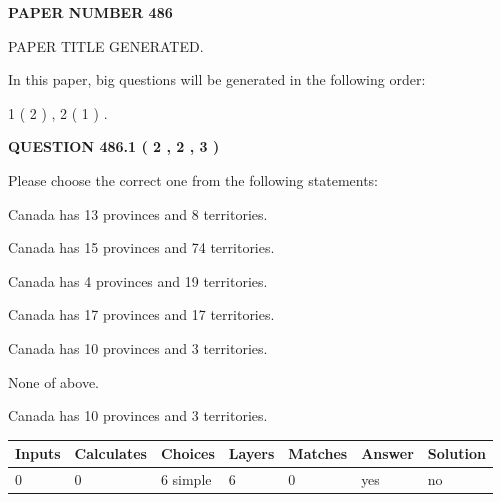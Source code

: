 \documentclass[12pt]{article}
\begin{document}
   
 {\textbf{ \Large{ PAPER NUMBER  486  }}}
   
   
\vspace{0.2in}
   
   
   
   
   
   
   
   
 \vspace{0.2in}
 
 
 
 
   
   
 PAPER TITLE GENERATED.
   
   
   
\vspace{0.2in}
   
In this paper, big questions will be generated in the following order: 
   
   
   1 ( 2 )
 ,
   2 ( 1 )
 .
  
\vspace{0.2in}
  
{\textbf{\Large{QUESTION
486.1 
 ( 2 , 2 , 3 )
}}}
  
  
Please choose the correct one from the following statements:
 
 
Canada has  13 provinces and  8 territories.
 
 
Canada has  15 provinces and  74 territories.
 
 
Canada has   4 provinces and  19 territories.
 
 
Canada has  17 provinces and  17 territories.
 
 
Canada has 10  provinces and 3 territories.
 
 
 None of above.
 
 
\noindent{}
 
 
Canada has 10  provinces and 3 territories.
 
 
\noindent{}
 
 
   
   
   
   
\noindent\begin{tabular}{|l|l|l|l|l|l|l|}
 \hline
Inputs & Calculates & Choices & Layers & Matches & Answer & Solution \\ \hline
 0  & 
 0  & 
 6
  simple  
  & 
 6  & 
 0  & 
  yes & 
  no 
  \\ \hline
 \end{tabular}
   
\end{document}
